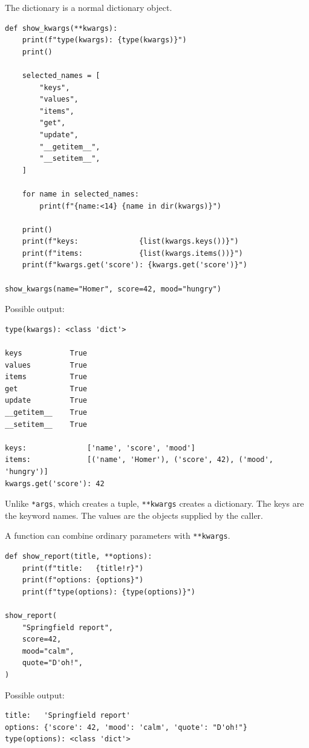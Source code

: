 The dictionary is a normal dictionary object.

\begin{verbatim}
def show_kwargs(**kwargs):
    print(f"type(kwargs): {type(kwargs)}")
    print()

    selected_names = [
        "keys",
        "values",
        "items",
        "get",
        "update",
        "__getitem__",
        "__setitem__",
    ]

    for name in selected_names:
        print(f"{name:<14} {name in dir(kwargs)}")

    print()
    print(f"keys:              {list(kwargs.keys())}")
    print(f"items:             {list(kwargs.items())}")
    print(f"kwargs.get('score'): {kwargs.get('score')}")

show_kwargs(name="Homer", score=42, mood="hungry")
\end{verbatim}

Possible output:

\begin{verbatim}
type(kwargs): <class 'dict'>

keys           True
values         True
items          True
get            True
update         True
__getitem__    True
__setitem__    True

keys:              ['name', 'score', 'mood']
items:             [('name', 'Homer'), ('score', 42), ('mood', 'hungry')]
kwargs.get('score'): 42
\end{verbatim}

Unlike \texttt{*args}, which creates a tuple, \texttt{**kwargs} creates a dictionary. The keys are the keyword names. The values are the objects supplied by the caller.

A function can combine ordinary parameters with \texttt{**kwargs}.

\begin{verbatim}
def show_report(title, **options):
    print(f"title:   {title!r}")
    print(f"options: {options}")
    print(f"type(options): {type(options)}")

show_report(
    "Springfield report",
    score=42,
    mood="calm",
    quote="D'oh!",
)
\end{verbatim}

Possible output:

\begin{verbatim}
title:   'Springfield report'
options: {'score': 42, 'mood': 'calm', 'quote': "D'oh!"}
type(options): <class 'dict'>
\end{verbatim}

